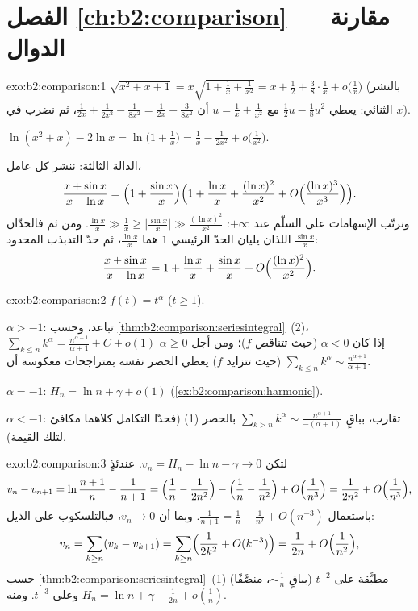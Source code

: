 \section*{الفصل \ref{ch:b2:comparison} --- مقارنة الدوال}

\begin{solution}{exo:b2:comparison:1}
$\sqrt{x^2 + x + 1} = x\sqrt{1 + \tfrac1x + \tfrac{1}{x^2}} = x +
\frac12 + \frac38\cdot\frac1x + o\bigl(\frac1x\bigr)$ (بالنشر
الثنائي: يعطي $\frac12 u - \frac18 u^2$ مع $u = \frac1x +
\frac{1}{x^2}$ أن $\frac{1}{2x} + \frac{1}{2x^2} -
\frac{1}{8x^2} = \frac{1}{2x} + \frac{3}{8x^2}$، ثم نضرب في
$x$).

$\ln(x^2 + x) - 2\ln x = \ln\bigl(1 + \tfrac1x\bigr) = \frac1x -
\frac{1}{2x^2} + o\bigl(\frac{1}{x^2}\bigr)$.

الدالة الثالثة: ننشر كل عامل،
\[
\frac{x + \sin x}{x - \ln x}
= \Bigl(1 + \frac{\sin x}{x}\Bigr)
\Bigl(1 + \frac{\ln x}{x} + \frac{(\ln x)^2}{x^2} +
O\Bigl(\frac{(\ln x)^3}{x^3}\Bigr)\Bigr).
\]
ونرتّب الإسهامات على السلّم عند $+\infty$: $\frac{\ln x}{x}
\gg \frac{1}{x} \geq \bigl|\frac{\sin x}{x}\bigr| \gg \frac{(\ln
x)^2}{x^2}$. ومن ثم فالحدّان اللذان يليان الحدّ الرئيسي $1$ هما
$\frac{\ln x}{x}$، ثم حدّ التذبذب المحدود $\frac{\sin
x}{x}$:
\[
\frac{x + \sin x}{x - \ln x}
= 1 + \frac{\ln x}{x} + \frac{\sin x}{x}
+ O\Bigl(\frac{(\ln x)^2}{x^2}\Bigr).
\]
\end{solution}

\begin{solution}{exo:b2:comparison:2}
$f(t) = t^\alpha$ ($t \geq 1$).

$\alpha > -1$: تباعد، وحسب
\cref{thm:b2:comparison:seriesintegral}~(2)، $\sum_{k\leq n}
k^\alpha = \frac{n^{\alpha+1}}{\alpha+1} + C + o(1)$ إذا كان $\alpha <
0$ (حيث تتناقص $f$)؛ ومن أجل $\alpha \geq 0$ (حيث تتزايد $f$) يعطي
الحصر نفسه بمتراجحات معكوسة أن $\sum_{k \leq n}
k^\alpha \sim \frac{n^{\alpha + 1}}{\alpha + 1}$.

$\alpha = -1$: $H_n = \ln n + \gamma + o(1)$
(\cref{ex:b2:comparison:harmonic}).

$\alpha < -1$: تقارب، بباقٍ $\sum_{k > n} k^\alpha
\sim \frac{n^{\alpha+1}}{-(\alpha+1)}$ بالحصر (1) (فحدّا
التكامل كلاهما مكافئ لتلك القيمة).
\end{solution}

\begin{solution}{exo:b2:comparison:3}
لتكن $v_n = H_n - \ln n - \gamma \to 0$. عندئذٍ
\[
v_n - v_{n+1} = \ln\frac{n+1}{n} - \frac{1}{n+1}
= \Bigl(\frac1n - \frac{1}{2n^2}\Bigr) - \Bigl(\frac1n -
\frac{1}{n^2}\Bigr) + O\Bigl(\frac{1}{n^3}\Bigr)
= \frac{1}{2n^2} + O\Bigl(\frac{1}{n^3}\Bigr),
\]
باستعمال $\frac{1}{n+1} = \frac1n - \frac{1}{n^2} + O(n^{-3})$. وبما أن
$v_n \to 0$، فبالتلسكوب على الذيل:
\[
v_n = \sum_{k \geq n} (v_k - v_{k+1})
= \sum_{k\geq n} \Bigl(\frac{1}{2k^2} + O(k^{-3})\Bigr)
= \frac{1}{2n} + O\Bigl(\frac{1}{n^2}\Bigr),
\]
حسب \cref{thm:b2:comparison:seriesintegral}~(1) مطبَّقة على $t^{-2}$
(بباقٍ $\sim \frac1n$، منصَّفًا) وعلى $t^{-3}$. ومنه $H_n =
\ln n + \gamma + \frac{1}{2n} + o(\frac1n)$.
\end{solution}

